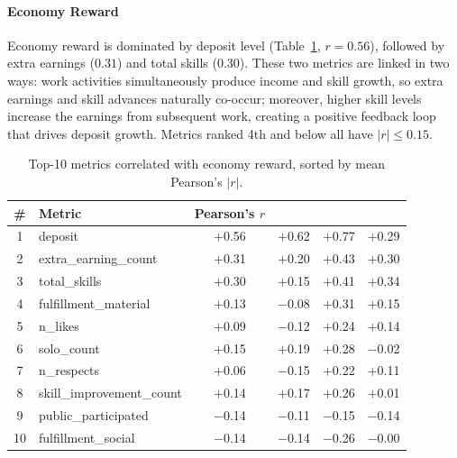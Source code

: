 \paragraph{Economy Reward}
Economy reward is dominated by deposit level (Table~\ref{tab:corr_economy}, $r = 0.56$),
followed by extra earnings ($0.31$) and total skills ($0.30$).
These two metrics are linked in two ways:
work activities simultaneously produce income and skill growth,
so extra earnings and skill advances naturally co-occur;
moreover, higher skill levels increase the earnings from subsequent work,
creating a positive feedback loop that drives deposit growth.
Metrics ranked 4th and below all have $|r| \leq 0.15$.

\begin{table}[htbp]
  \centering
  \caption{%
    Top-10 metrics correlated with economy reward, sorted by mean Pearson's $|r|$.
  }
  \label{tab:corr_economy}
  \small
  \begin{tabular}{clcccc}
    \toprule
    \# & Metric & Pearson's $r$ & \apartment{} & \academy{} & \campus{} \\
    \midrule
    1  & deposit                  & $+$0.56 & $+$0.62 & $+$0.77 & $+$0.29 \\
    2  & extra\_earning\_count    & $+$0.31 & $+$0.20 & $+$0.43 & $+$0.30 \\
    3  & total\_skills            & $+$0.30 & $+$0.15 & $+$0.41 & $+$0.34 \\
    4  & fulfillment\_material    & $+$0.13 & $-$0.08 & $+$0.31 & $+$0.15 \\
    5  & n\_likes                 & $+$0.09 & $-$0.12 & $+$0.24 & $+$0.14 \\
    6  & solo\_count              & $+$0.15 & $+$0.19 & $+$0.28 & $-$0.02 \\
    7  & n\_respects              & $+$0.06 & $-$0.15 & $+$0.22 & $+$0.11 \\
    8  & skill\_improvement\_count& $+$0.14 & $+$0.17 & $+$0.26 & $+$0.01 \\
    9  & public\_participated     & $-$0.14 & $-$0.11 & $-$0.15 & $-$0.14 \\
    10 & fulfillment\_social      & $-$0.14 & $-$0.14 & $-$0.26 & $-$0.00 \\
    \bottomrule
  \end{tabular}
\end{table}


